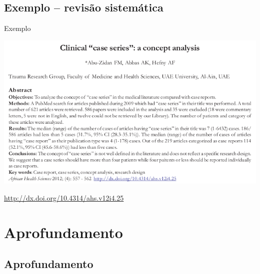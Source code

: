 \documentclass{beamer}
\begin{document}

\subsection{Exemplo -- revisão sistemática}

\begin{frame}{Exemplo}
  \begin{exampleblock}{}
    \begin{center}
      \includegraphics[width=\textwidth]{Metodos/case-series}

      \bigskip
      \tiny \url{http://dx.doi.org/10.4314/ahs.v12i4.25}
    \end{center}
  \end{exampleblock}
\end{frame}

\section{Aprofundamento}

\subsection{Aprofundamento}
\end{document}
